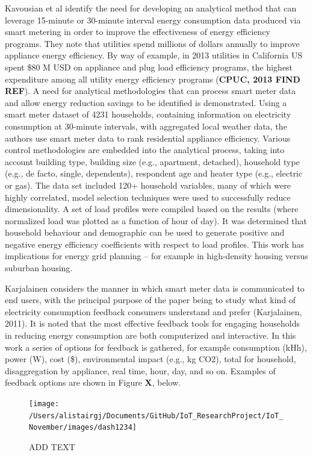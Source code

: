 \documentclass[11pt,]{article}
\begin{document}
Kavousian et al identify the need for developing an analytical method
that can leverage 15-minute or 30-minute interval energy consumption
data produced via smart metering in order to improve the effectiveness
of energy efficiency programs. They note that utilities spend millions
of dollars annually to improve appliance energy efficiency. By way of
example, in 2013 utilities in California US spent \$80 M USD on
appliance and plug load efficiency programs, the highest expenditure
among all utility energy efficiency programs (\textbf{CPUC, 2013 FIND
REF}). A need for analytical methodologies that can process smart meter
data and allow energy reduction savings to be identified is
demonstrated. Using a smart meter dataset of 4231 households, containing
information on electricity consumption at 30-minute intervals, with
aggregated local weather data, the authors use smart meter data to rank
residential appliance efficiency. Various control methodologies are
embedded into the analytical process, taking into account building type,
building size (e.g., apartment, detached), household type (e.g., de
facto, single, dependents), respondent age and heater type (e.g.,
electric or gas). The data set included 120+ household variables, many
of which were highly correlated, model selection techniques were used to
successfully reduce dimensionality. A set of load profiles were compiled
based on the results (where normalized load was plotted as a function of
hour of day). It was determined that household behaviour and demographic
can be used to generate positive and negative energy efficiency
coefficients with respect to load profiles. This work has implications
for energy grid planning -- for example in high-density housing versus
suburban housing.

Karjalainen considers the manner in which smart meter data is
communicated to end users, with the principal purpose of the paper being
to study what kind of electricity consumption feedback consumers
understand and prefer (Karjalainen, 2011). It is noted that the most
effective feedback tools for engaging households in reducing energy
consumption are both computerized and interactive. In this work a series
of options for feedback is gathered, for example consumption (kHh),
power (W), cost (\$), environmental impact (e.g., kg CO2), total for
household, disaggregation by appliance, real time, hour, day, and so on.
Examples of feedback options are shown in Figure \textbf{X}, below.

\begin{figure}[H]

{\centering \texttt{[image: /Users/alistairgj/Documents/GitHub/IoT\_ResearchProject/IoT\_November/images/dash1234]} 

}

\caption{ADD TEXT}\label{fig:unnamed-chunk-1}
\end{figure}
\end{document}
